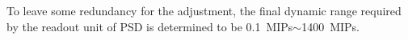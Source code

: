 \documentclass[5p, times]{elsarticle}
\begin{document}
To leave some redundancy for the adjustment, the final dynamic range required by the readout unit of PSD is determined to be \SI{0.1}{MIPs}$\sim$\SI{1400}{MIPs}.

\end{document}
